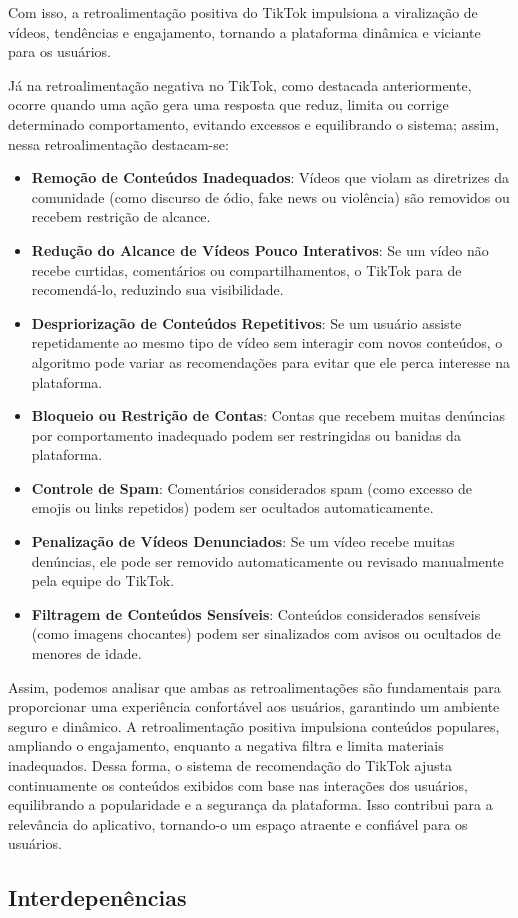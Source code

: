 \newpage
Com isso, a retroalimentação positiva do TikTok impulsiona a viralização de vídeos, tendências e engajamento, tornando a plataforma dinâmica e viciante para os usuários.\vskip0.3cm

Já na retroalimentação negativa no TikTok, como destacada anteriormente, ocorre quando uma ação gera uma resposta que reduz, limita ou corrige determinado comportamento, evitando excessos e equilibrando o sistema; assim, nessa retroalimentação destacam-se:

\begin{itemize}
\item \textbf{Remoção de Conteúdos Inadequados}:
Vídeos que violam as diretrizes da comunidade (como discurso de ódio, fake news ou violência) são removidos ou recebem restrição de alcance.

\item \textbf{Redução do Alcance de Vídeos Pouco Interativos}:
Se um vídeo não recebe curtidas, comentários ou compartilhamentos, o TikTok para de recomendá-lo, reduzindo sua visibilidade.

\item \textbf{Despriorização de Conteúdos Repetitivos}:
Se um usuário assiste repetidamente ao mesmo tipo de vídeo sem interagir com novos conteúdos, o algoritmo pode variar as recomendações para evitar que ele perca interesse na plataforma.

\item \textbf{Bloqueio ou Restrição de Contas}:
Contas que recebem muitas denúncias por comportamento inadequado podem ser restringidas ou banidas da plataforma.

\item \textbf{Controle de Spam}: 
Comentários considerados spam (como excesso de emojis ou links repetidos) podem ser ocultados automaticamente.

\item \textbf{Penalização de Vídeos Denunciados}:
Se um vídeo recebe muitas denúncias, ele pode ser removido automaticamente ou revisado manualmente pela equipe do TikTok.

\item \textbf{Filtragem de Conteúdos Sensíveis}:
Conteúdos considerados sensíveis (como imagens chocantes) podem ser sinalizados com avisos ou ocultados de menores de idade.
\end{itemize}



Assim, podemos analisar que ambas as retroalimentações são fundamentais para proporcionar uma experiência confortável aos usuários, garantindo um ambiente seguro e dinâmico. A retroalimentação positiva impulsiona conteúdos populares, ampliando o engajamento, enquanto a negativa filtra e limita materiais inadequados. Dessa forma, o sistema de recomendação do TikTok ajusta continuamente os conteúdos exibidos com base nas interações dos usuários, equilibrando a popularidade e a segurança da plataforma. Isso contribui para a relevância do aplicativo, tornando-o um espaço atraente e confiável para os usuários.




\subsection{Interdepenências}